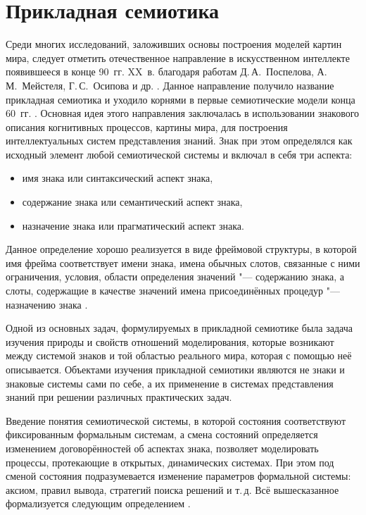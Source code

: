 \section{Прикладная семиотика} \label{sect1_3}

Среди многих исследований, заложивших основы построения моделей картин мира, следует отметить отечественное направление в искусственном интеллекте появившееся в конце 90~гг. XX~в. благодаря работам Д.\,А.~Поспелова, А.\,М.~Мейстеля, Г.\,С.~Осипова и др. \cite{Osipov1995,Pospelov1996,Ehrlich1997,Osipov1999,Osipov2000b,Osipov2002a,Osipov2002b}. Данное направление получило название прикладная семиотика и уходило корнями в первые семиотические модели конца 60~гг. \cite{Pospelov1976}. Основная идея этого направления заключалась в использовании знакового описания когнитивных процессов, картины мира, для построения интеллектуальных систем представления знаний. Знак при этом определялся как исходный элемент любой семиотической системы и включал в себя три аспекта:
\begin{itemize}
	\item имя знака или синтаксический аспект знака,
	\item содержание знака или семантический аспект знака,
	\item назначение знака или прагматический аспект знака.
\end{itemize}

Данное определение хорошо реализуется в виде фреймовой структуры, в которой имя фрейма соответствует имени знака, имена обычных слотов, связанные с ними ограничения, условия, области определения значений "--- содержанию знака, а слоты, содержащие в качестве значений имена присоединённых процедур "--- назначению знака \cite{Osipov1999}. 

Одной из основных задач, формулируемых в прикладной семиотике была задача изучения природы и свойств отношений моделирования, которые возникают между системой знаков и той областью реального мира, которая с помощью неё описывается. Объектами изучения прикладной семиотики являются не знаки и знаковые системы сами по себе, а  их применение в системах представления знаний при решении различных практических задач.

Введение понятия семиотической системы, в которой состояния соответствуют фиксированным формальным системам, а смена состояний определяется изменением договорённостей об аспектах знака, позволяет моделировать процессы, протекающие в открытых, динамических системах. При этом под сменой состояния подразумевается изменение параметров формальной системы: аксиом, правил вывода, стратегий поиска решений и т.\,д. Всё вышесказанное формализуется следующим определением \cite{Osipov2002a}.

